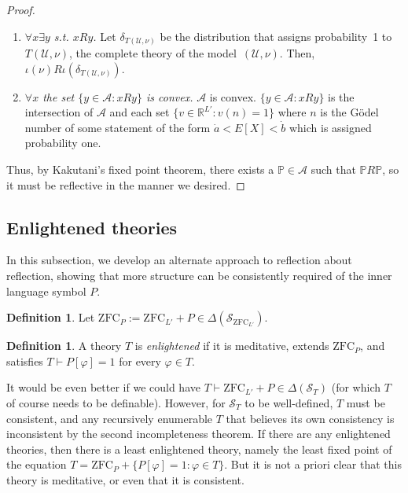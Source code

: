 \documentclass[12pt]{article}
\newcommand{\PP}{\mathbb{P}}
\newcommand{\vp}{\varphi}
\newcommand{\RR}{\mathbb{R}}
\newcommand{\zfc}{\mathrm{ZFC}}
\newcommand{\zfcl}{{\zfc_{\cL}}}
\newcommand{\zfcp}{{\zfc_P}}
\newcommand{\cA}{\mathcal{A}}
\newcommand{\cL}{L'}
\newcommand{\cS}{\mathcal{S}}
\newcommand{\cU}{\mathcal{U}}
\theoremstyle{plain}
\theoremstyle{definition}
\newtheorem{definition}[theorem]{Definition}
\theoremstyle{remark}
\begin{document}
\begin{proof}
\begin{enumerate}
\item \emph{$\forall x \exists y$ s.t. $xRy$.} Let $\delta_{T(\cU,\nu)}$ be the distribution that assigns probability~1 to~$T(\cU,\nu)$, the complete theory of the model~$(\cU,\nu)$. Then, $\iota(\nu)R\iota(\delta_{T(\cU,\nu)})$.

\item \emph{$\forall x$ the set $\{y \in \mathcal{A}: xRy\}$ is convex.} $\cA$ is convex. $\{y\in\cA:xRy\}$ is the intersection of $\cA$ and each set $\{v\in\RR^{L'} : v(n) = 1\}$ where $n$ is the G\"odel number of some statement of the form $\dot a < E[X]<\dot b$ which is assigned probability one.
\end{enumerate}
Thus, by Kakutani's fixed point theorem, there exists a $\PP\in\cA$ such that 
$\PP R\PP$, so it must be reflective in the manner we desired.

\end{proof}
\subsection{Enlightened theories}
In this subsection, we develop an alternate approach to reflection about reflection, showing that more structure can be consistently required of the inner language symbol $P$.
\begin{definition}
Let $\zfcp := \zfcl + P\in\Delta(\cS_\zfcl)$.
\end{definition}
\begin{definition}
A theory $T$ is \emph{enlightened} if it is meditative, extends $\zfcp$, and satisfies $T\vdash P[\vp] = 1$ for every $\vp\in T$.
\end{definition}
It would be even better if we could have $T\vdash\zfcl + P\in\Delta(\cS_T)$ (for which $T$ of course needs to be definable). However, for $\cS_T$ to be well-defined, $T$ must be consistent, and any recursively enumerable $T$ that believes its own consistency is inconsistent by the second incompleteness theorem.
If there are any enlightened theories, then there is a least enlightened theory, namely the least fixed point of the equation $T = \zfcp + \{P[\vp] = 1 : \vp\in T\}$. But it is not a priori clear that this theory is meditative, or even that it is consistent. 
\end{document}
